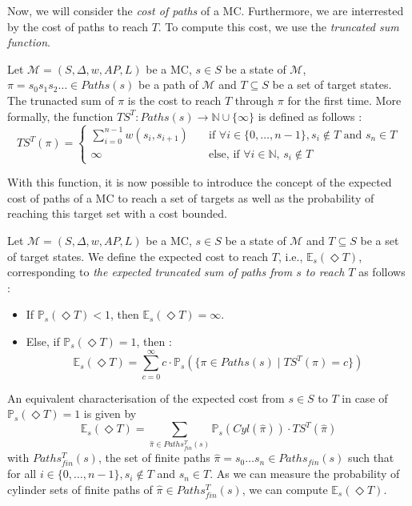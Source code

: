 Now, we will consider the \textit{cost of paths} of a MC. Furthermore, we
are interrested by the cost of paths to reach $T$. To compute this cost, we use the \textit{truncated sum function}.

\begin{definition}
  Let $\mathcal{M}=(S, \Delta, w, AP, L)$ be a MC, $s \in S$ be a state of $\mathcal{M}$, $\pi = s_0s_1s_2\dots \in Paths(s)$ be a path of $\mathcal{M}$ and $T \subseteq S$ be a set of target states.
  The trunacted sum of $\pi$ is the cost to reach $T$ through $\pi$
  for the first time. More formally, the function $TS^T : Paths(s) \rightarrow \mathbb{N} \cup \{\infty\}$ is defined as follows :
	\[
		TS^T(\pi) =
		\begin{cases}
			\sum_{i = 0}^{n-1} w(s_i, s_{i+1}) & \quad \text{if } \forall i \in \{0, \dots, n - 1\}, s_i \not\in T \text{ and } s_n \in T \\
			\infty & \quad \text{else, if } \forall i \in \mathbb{N}, \, s_i \notin T
		\end{cases}
	\]
\end{definition}
With this function, it is now possible to introduce the concept of the
expected cost of paths of a MC to reach a set of targets as well as
the probability of reaching this target set with a cost bounded.

\begin{definition}
	Let $\mathcal{M} = (S, \Delta, w, AP, L)$ be a MC, $s \in S$ be a state of $\mathcal{M}$ and $T \subseteq S$ be a set of target states. We define the expected cost to reach $T$, i.e., $\mathbb{E}_s(\Diamond T)$, corresponding to \textit{the expected truncated sum of paths from $s$ to reach $T$} as follows :
	\begin{itemize}
	\renewcommand{\labelitemi}{\tiny$\bullet$}
	\item If $\mathbb{P}_s(\Diamond T) < 1$, then $\mathbb{E}_s(\Diamond T) = \infty$.%
	\item Else, if $\mathbb{P}_s(\Diamond T) = 1$, then :
	\[
    \mathbb{E}_s(\Diamond T) = \sum_{c = 0}^\infty c \cdot \mathbb{P}_s(\{\pi \in Paths(s) \; | \; TS^T(\pi) = c \})
  \]
	\end{itemize}
\end{definition}

An equivalent characterisation of the expected cost from $s \in S$ to $T$ in case of $\mathbb{P}_s(\Diamond T) = 1$ is given by
\[
  \mathbb{E}_s(\Diamond T) = \sum_{\hat{\pi} \in Paths_{fin}^T(s)} \mathbb{P}_s(Cyl(\hat{\pi})) \cdot TS^T(\hat{\pi})
\]
with $Paths^T_{fin}(s)$, the set of finite paths $\hat{\pi} = s_0 \dots s_n \in Paths_{fin}(s)$  such that for all $i \in \{0, \dots, n-1\}, s_i \not \in T$ and $s_n \in T$. As we can measure the probability of cylinder sets of finite paths of $\hat{\pi} \in Paths_{fin}^T(s)$, we can compute $\mathbb{E}_s(\Diamond T)$.

